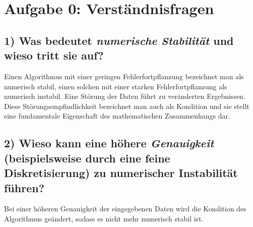 \setcounter{secnumdepth}{0}
\section{Aufgabe 0: Verständnisfragen}
\label{sec:auf0}

\subsection{1) \textbf{Was bedeutet \textit{numerische Stabilität} und wieso tritt sie auf?}}

Einen Algorithmus mit einer geringen Fehlerfortpflanzung bezeichnet man als numerisch stabil, einen solchen mit einer starken Fehlerfortpflanzung als numerisch instabil.
Eine Störung der Daten führt zu veränderten Ergebnissen.
Diese Störungsempfindlichkeit bezeichnet man auch als Kondition und sie stellt eine fundamentale Eigenschaft des mathematischen Zusammenhangs dar.

\subsection{2) \textbf{Wieso kann eine höhere \textit{Genauigkeit} (beispielsweise durch eine feine Diskretisierung) zu numerischer Instabilität führen?}}

Bei einer höheren Genauigkeit der eingegebenen Daten wird die Kondition des Algorithmus geändert, sodass es nicht mehr numerisch stabil ist.